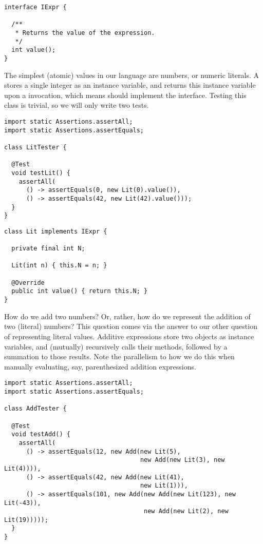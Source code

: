 \begin{lstlisting}[language=MyJava]
interface IExpr {

  /**
   * Returns the value of the expression.
   */
  int value();
}
\end{lstlisting}

The simplest (atomic) values in our language are numbers, or numeric literals. 
A  stores a single integer as an instance variable, and returns this instance variable upon a  invocation, which means  should implement the  interface. 
Testing this class is trivial, so we will only write two tests.

\begin{lstlisting}[language=MyJava]
import static Assertions.assertAll;
import static Assertions.assertEquals;

class LitTester {

  @Test
  void testLit() {
    assertAll(
      () -> assertEquals(0, new Lit(0).value()),      
      () -> assertEquals(42, new Lit(42).value()));
  }
}
\end{lstlisting}

\begin{lstlisting}[language=MyJava]
class Lit implements IExpr {

  private final int N;

  Lit(int n) { this.N = n; }

  @Override
  public int value() { return this.N; }
}
\end{lstlisting}

How do we add two numbers? 
Or, rather, how do we represent the addition of two (literal) numbers? 
This question comes via the answer to our other question of representing literal values. 
Additive expressions store two  objects as instance variables, and (mutually) recursively calls their  methods, followed by a summation to those results. 
Note the parallelism to how we do this when manually evaluating, say, parenthesized addition expressions.

\begin{lstlisting}[language=MyJava]
import static Assertions.assertAll;
import static Assertions.assertEquals;

class AddTester {

  @Test
  void testAdd() {
    assertAll(
      () -> assertEquals(12, new Add(new Lit(5), 
                                     new Add(new Lit(3), new Lit(4)))),
      () -> assertEquals(42, new Add(new Lit(41), 
                                     new Lit(1))),
      () -> assertEquals(101, new Add(new Add(new Lit(123), new Lit(-43)),
                                      new Add(new Lit(2), new Lit(19)))));
  }
}
\end{lstlisting}

